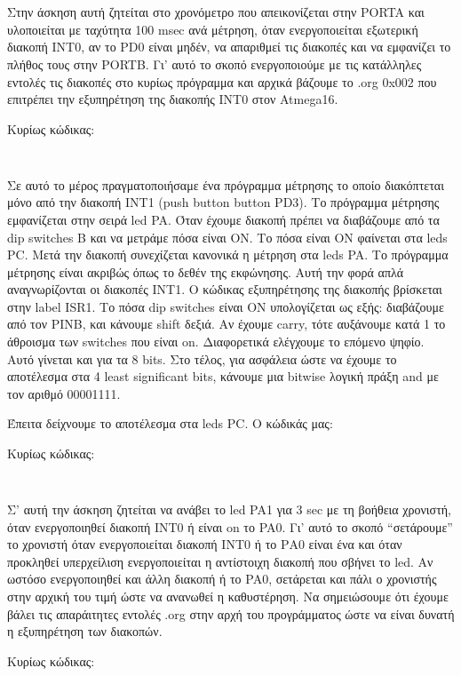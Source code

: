 \documentclass[a4paper,10pt]{article} \usepackage{anysize}
\begin{document}
\def\thesubsection {Άσκηση (\roman{subsection})}



\section*{} 
\subsection{}

Στην άσκηση αυτή ζητείται στο χρονόμετρο που απεικονίζεται στην PORTA και
υλοποιείται με ταχύτητα 100 msec ανά μέτρηση, όταν ενεργοποιείται εξωτερική
διακοπή INT0, αν το PD0 είναι μηδέν, να απαριθμεί τις διακοπές και να
εμφανίζει το πλήθος τους στην PORTB. Γι' αυτό το σκοπό ενεργοποιούμε με τις
κατάλληλες εντολές τις διακοπές στο κυρίως πρόγραμμα και αρχικά βάζουμε το
.org 0x002 που επιτρέπει την εξυπηρέτηση της διακοπής INT0 στον Atmega16.

\noindent Κυρίως κώδικας:
\inputminted[linenos,obeytabs,fontsize=\footnotesize]{nasm}{files/part1.S}

\subsection{}
Σε αυτό το μέρος πραγματοποιήσαμε ένα πρόγραμμα μέτρησης το οποίο διακόπτεται
μόνο από την διακοπή INT1 (push button button PD3).  Το πρόγραμμα μέτρησης
εμφανίζεται στην σειρά led PA. Όταν έχουμε διακοπή πρέπει να διαβάζουμε από τα
dip switches B και να μετράμε πόσα είναι ON.  Το πόσα είναι ON φαίνεται στα
leds PC. Μετά την διακοπή συνεχίζεται κανονικά η μέτρηση στα leds PA.  Το
πρόγραμμα μέτρησης είναι ακριβώς όπως το δεθέν της εκφώνησης. Αυτή την φορά
απλά αναγνωρίζονται οι διακοπές INT1. Ο κώδικας εξυπηρέτησης της διακοπής
βρίσκεται στην label ISR1. Το πόσα dip switches είναι ON υπολογίζεται ως εξής:
διαβάζουμε από τον PINB, και κάνουμε shift δεξιά. Αν έχουμε carry, τότε
αυξάνουμε κατά 1 το άθροισμα των switches που είναι on. Διαφορετικά ελέγχουμε
το επόμενο ψηφίο. Αυτό γίνεται και για τα 8 bits.  Στο τέλος, για ασφάλεια
ώστε να έχουμε το αποτέλεσμα στα 4 least significant bits, κάνουμε μια bitwise
λογική πράξη and με τον αριθμό 00001111.

Έπειτα δείχνουμε το αποτέλεσμα στα leds PC. Ο κώδικάς μας: 

\noindent Κυρίως κώδικας:
\inputminted[linenos,obeytabs,fontsize=\footnotesize]{nasm}{files/part2.S}

\subsection{}
Σ' αυτή την άσκηση ζητείται να ανάβει το led PA1 για 3 sec με τη βοήθεια
χρονιστή, όταν ενεργοποιηθεί διακοπή INT0 ή είναι on το PA0.  Γι' αυτό το
σκοπό “σετάρουμε” το χρονιστή όταν ενεργοποιείται διακοπή ΙΝΤ0 ή το PΑ0 είναι
ένα και όταν προκληθεί υπερχείλιση ενεργοποιείται η αντίστοιχη διακοπή που
σβήνει το led. Αν ωστόσο ενεργοποιηθεί και άλλη διακοπή ή το PA0, σετάρεται
και πάλι ο χρονιστής στην αρχική του τιμή ώστε να ανανωθεί η καθυστέρηση. Να
σημειώσουμε ότι έχουμε βάλει τις απαράιτητες εντολές .org στην αρχή του
προγράμματος ώστε να είναι δυνατή η εξυπηρέτηση των διακοπών.

\noindent Κυρίως κώδικας:
\inputminted[linenos,obeytabs,fontsize=\footnotesize]{nasm}{files/part3.S}
\end{document}
